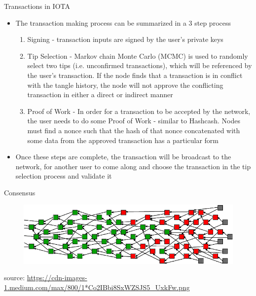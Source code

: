 \documentclass[11pt]{beamer}
\begin{document}
\begin{frame}{Transactions in IOTA}
	\begin{itemize}
		\item The transaction making process can be summarized in a 3 step process
		\begin{enumerate}
			\item Signing - transaction inputs are signed by the user's private keys
			\item Tip Selection - Markov chain Monte Carlo (MCMC) is used to randomly select two tips (i.e. unconfirmed transactions), which will be referenced by the user's transaction. If the node finds that a transaction is in conflict with the tangle history, the node will not approve the conflicting transaction in either a direct or indirect manner
			\item Proof of Work - In order for a transaction to be accepted by the network, the user needs to do some Proof of Work - similar to Hashcash. Nodes must find a nonce such that the hash of that nonce concatenated with some data from the approved transaction has a particular form
		\end{enumerate}
		\item Once these steps are complete, the transaction will be broadcast to the network, for another user to come along and choose the transaction in the tip selection process and validate it
	\end{itemize}
\end{frame}


\begin{frame}{Consensus}
	\begin{figure}[]
		\centering
		\includegraphics  [scale=0.3]{Images/iota-consensus}
	\end{figure}
	\begin{scriptsize}
		source: \href{https://blog.iota.org/a-primer-on-iota-with-presentation-e0a6eb2cc621}{https://cdn-images-1.medium.com/max/800/1*Co2IBbi8SxWZSJS5\_UxkFw.png}
	\end{scriptsize}
\end{frame}
\end{document}
